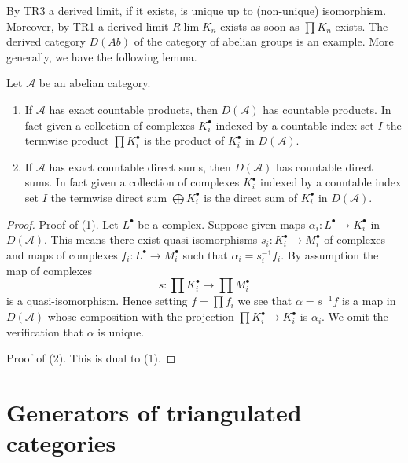 \noindent
By TR3 a derived limit, if it exists, is unique up to (non-unique)
isomorphism. Moreover, by TR1 a derived limit $R\lim K_n$ exists
as soon as $\prod K_n$ exists. The derived category $D(\textit{Ab})$
of the category of abelian groups is an example. More generally,
we have the following lemma.

\begin{lemma}
\label{lemma-product-derived-Ab4-star}
Let $\mathcal{A}$ be an abelian category.
\begin{enumerate}
\item If $\mathcal{A}$ has exact countable products, then
$D(\mathcal{A})$ has countable products. In fact given
a collection of complexes $K_i^\bullet$ indexed by a countable index set $I$
the termwise product $\prod K_i^\bullet$
is the product of $K_i^\bullet$ in $D(\mathcal{A})$.
\item If $\mathcal{A}$ has exact countable direct sums, then
$D(\mathcal{A})$ has countable direct sums. In fact given
a collection of complexes $K_i^\bullet$ indexed by a countable
index set $I$ the termwise direct sum $\bigoplus K_i^\bullet$
is the direct sum of $K_i^\bullet$ in $D(\mathcal{A})$.
\end{enumerate}
\end{lemma}

\begin{proof}
Proof of (1). Let $L^\bullet$ be a complex. Suppose given maps
$\alpha_i : L^\bullet \to K_i^\bullet$ in $D(\mathcal{A})$.
This means there exist quasi-isomorphisms $s_i : K_i^\bullet \to M_i^\bullet$
of complexes and maps of complexes $f_i : L^\bullet \to M_i^\bullet$
such that $\alpha_i = s_i^{-1}f_i$. By assumption the map of complexes
$$
s : \prod K_i^\bullet \longrightarrow \prod M_i^\bullet
$$
is a quasi-isomorphism. Hence setting $f = \prod f_i$ we see that
$\alpha = s^{-1}f$ is a map in $D(\mathcal{A})$ whose composition
with the projection $\prod K_i^\bullet \to K_i^\bullet$ is $\alpha_i$.
We omit the verification that $\alpha$ is unique.

\medskip\noindent
Proof of (2). This is dual to (1).
\end{proof}







\section{Generators of triangulated categories}
\label{section-generators}

